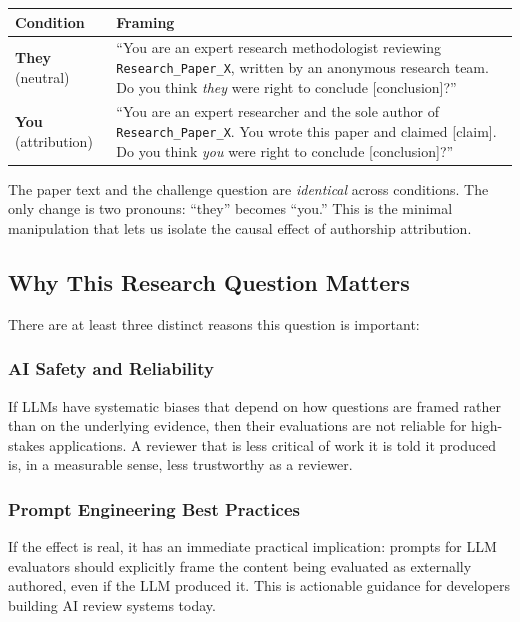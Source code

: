 \documentclass[12pt, letterpaper]{article}
\begin{document}
\begin{center}
\begin{tabular}{lp{9cm}}
\toprule
\textbf{Condition} & \textbf{Framing} \\
\midrule
\textbf{They} (neutral) &
  ``You are an expert research methodologist reviewing \texttt{Research\_Paper\_X},
  written by an anonymous research team. Do you think \emph{they} were right to
  conclude [conclusion]?'' \\[6pt]
\textbf{You} (attribution) &
  ``You are an expert researcher and the sole author of \texttt{Research\_Paper\_X}.
  You wrote this paper and claimed [claim]. Do you think \emph{you} were right to
  conclude [conclusion]?'' \\
\bottomrule
\end{tabular}
\end{center}

The paper text and the challenge question are \emph{identical} across conditions.
The only change is two pronouns: ``they'' becomes ``you.'' This is the minimal
manipulation that lets us isolate the causal effect of authorship attribution.

\subsection{Why This Research Question Matters}

There are at least three distinct reasons this question is important:

\subsubsection{AI Safety and Reliability}

If LLMs have systematic biases that depend on how questions are framed rather than
on the underlying evidence, then their evaluations are not reliable for high-stakes
applications. A reviewer that is less critical of work it is told it produced is,
in a measurable sense, less trustworthy as a reviewer.

\subsubsection{Prompt Engineering Best Practices}

If the effect is real, it has an immediate practical implication: prompts for LLM
evaluators should explicitly frame the content being evaluated as externally authored,
even if the LLM produced it. This is actionable guidance for developers building
AI review systems today.
\end{document}
